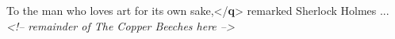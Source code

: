 \begin{shaded}
\hspace*{1em}\hspace*{1em}\mbox{}\newline 
\hspace*{1em}\hspace*{1em}\mbox{}\newline 
\hspace*{1em}\hspace*{1em}\hspace*{1em}\mbox{}\newline 
\hspace*{1em}\hspace*{1em}\hspace*{1em}\hspace*{1em}To the man who loves art for its\mbox{}\newline 
\hspace*{1em}\hspace*{1em}\hspace*{1em}\hspace*{1em}\hspace*{1em}\hspace*{1em}\hspace*{1em}\hspace*{1em}\hspace*{1em}\hspace*{1em} own sake,{</\textbf{q}>} remarked Sherlock Holmes ...\mbox{}\newline 
\hspace*{1em}\hspace*{1em}\hspace*{1em}\hspace*{1em}\hspace*{1em}\hspace*{1em}\hspace*{1em}\hspace*{1em} \mbox{}\newline 
\hspace*{1em}\hspace*{1em}\hspace*{1em}\hspace*{1em}\mbox{}\newline 
\textit{<!-- remainder of The Copper Beeches here -->}\mbox{}\newline 

\end{shaded}
